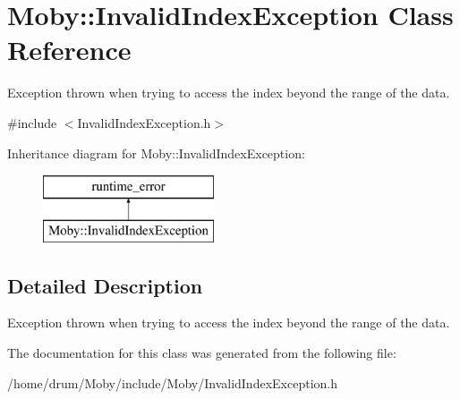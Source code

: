 \section{Moby\-:\-:Invalid\-Index\-Exception Class Reference}
\label{classMoby_1_1InvalidIndexException}


Exception thrown when trying to access the index beyond the range of the data.  




{\ttfamily \#include $<$Invalid\-Index\-Exception.\-h$>$}

Inheritance diagram for Moby\-:\-:Invalid\-Index\-Exception\-:\begin{figure}[H]
\begin{center}
\leavevmode
\includegraphics[height=2.000000cm]{classMoby_1_1InvalidIndexException}
\end{center}
\end{figure}


\subsection{Detailed Description}
Exception thrown when trying to access the index beyond the range of the data. 

The documentation for this class was generated from the following file\-:\begin{DoxyCompactItemize}
\item 
/home/drum/\-Moby/include/\-Moby/Invalid\-Index\-Exception.\-h\end{DoxyCompactItemize}
